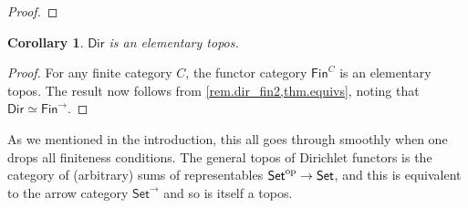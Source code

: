 \documentclass[11pt, article, one side]{memoir}
\theoremstyle{theorem}
\newtheorem{corollary}[section]{Corollary}
\theoremstyle{definition}
\theoremstyle{remark}
\newcommand{\Cat}[1]{\mathsf{#1}}%
\newcommand{\op}{^\tn{op}}
\newcommand{\tn}[1]{\textnormal{#1}}
\newcommand{\smset}{\Cat{Set}}
\newcommand{\finset}{\Cat{Fin}}
\newcommand{\bun}{\Cat{Bun}}
\newcommand{\dir}{\Cat{Dir}}
\begin{document}
\begin{proof}
\end{proof}

\begin{corollary}\label{cor.dir_topos}
$\dir$ is an elementary topos.
\end{corollary}
\begin{proof}
For any finite category $C$, the functor category $\finset^C$ is an elementary topos. The result now follows from \cref{rem.dir_fin2,thm.equivs}, noting that $\dir \simeq \finset^{\to}$.
\end{proof}

As we mentioned in the introduction, this all goes through smoothly when one drops all finiteness conditions. The general topos of Dirichlet functors is the category of (arbitrary) sums of representables $\smset\op \to \smset$, and this is equivalent to the arrow category $\smset^{\to}$ and so is itself a topos.
\end{document}
